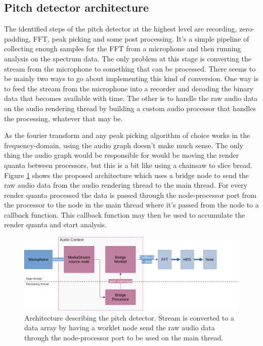 \subsection{Pitch detector architecture}
The identified steps of the pitch detector at the highest level are recording, zero-padding, FFT, peak picking and some post processing. It's a simple pipeline of collecting enough samples for the FFT from a microphone and then running analysis on the spectrum data. The only problem at this stage is converting the stream from the microphone to something that can be processed. There seems to be mainly two ways to go about implementing this kind of conversion. One way is to feed the stream from the microphone into a recorder and decoding the binary data that becomes available with time. The other is to handle the raw audio data on the audio rendering thread by building a custom audio processor that handles the processing, whatever that may be. 

As the fourier transform and any peak picking algorithm of choice works in the frequency-domain, using the audio graph doesn't make much sense. The only thing the audio graph would be responsible for would be moving the render quanta between processors, but this is a bit like using a chainsaw to slice bread. Figure \ref{fig:pdArch} shows the proposed architecture which uses a bridge node to send the raw audio data from the audio rendering thread to the main thread. For every render quanta processed the data is passed through the node-processor port from the processor to the node in the main thread where it's passed from the node to a callback function. This callback function may then be used to accumulate the render quanta and start analysis.

\begin{figure}[ht]
    \centering
    \includegraphics[width=\textwidth]{./images/pdArchitecture.png}
    \caption{Architecture describing the pitch detector. Stream is converted to a data array by having a worklet node send the raw audio data through the node-processor port to be used on the main thread.\label{fig:pdArch}}
\end{figure}

